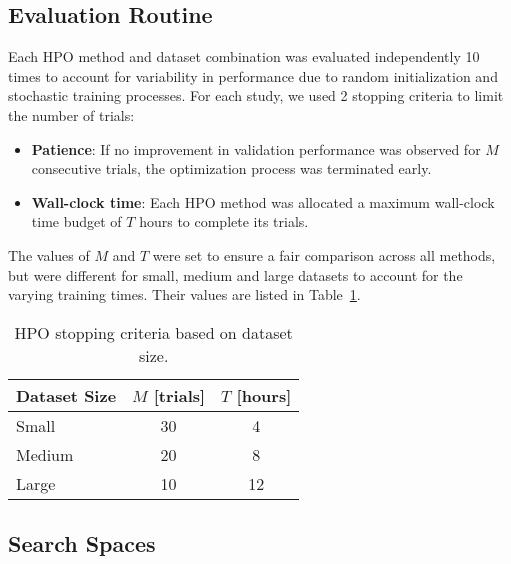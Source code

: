 \subsection{Evaluation Routine}
Each HPO method and dataset combination was evaluated independently 10 times to account for variability in performance due to random initialization and stochastic training processes. For each study, we used 2 stopping criteria to limit the number of trials:
\begin{itemize}
	\item \textbf{Patience}: If no improvement in validation performance was observed for \( M \) consecutive trials, the optimization process was terminated early.
	\item \textbf{Wall-clock time}: Each HPO method was allocated a maximum wall-clock time budget of \( T \) hours to complete its trials.
\end{itemize}
The values of \( M \) and \( T \) were set to ensure a fair comparison across all methods, but were different for small, medium and large datasets to account for the varying training times. Their values are listed in Table~\ref{tab:stopping-criteria}.

\begin{table}
	\caption{HPO stopping criteria based on dataset size.}
	\label{tab:stopping-criteria}
	\centering
	\begin{tabular}{lcc}
		\toprule
		Dataset Size & \( M \) [trials] & \( T \) [hours] \\
		\midrule
		Small        & 30               & 4               \\
		Medium       & 20               & 8               \\
		Large        & 10               & 12              \\
		\bottomrule
	\end{tabular}
\end{table}

\subsection{Search Spaces}

